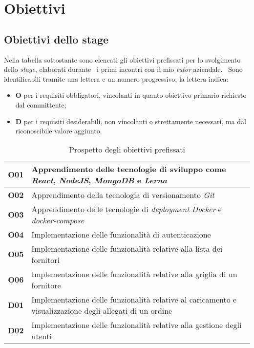 \section{Obiettivi}

\subsection{Obiettivi dello stage}
Nella tabella sottostante sono elencati gli obiettivi prefissati per lo svolgimento dello \emph{stage}, elaborati durante \
i primi incontri con il mio \emph{tutor} aziendale. \
Sono identificabili tramite una lettera e un numero progressivo; la lettera indica:
\begin{itemize}
  \item \textbf{O} per i requisiti obbligatori, vincolanti in quanto obiettivo primario richiesto dal committente;
  \item \textbf{D} per i requisiti desiderabili, non vincolanti o strettamente necessari, ma dal riconoscibile valore aggiunto.
\end{itemize}

\begin{center}
  \begin{table}[h]
    \begin{tabular}{ c | p{\textwidth - 40pt} }
      \textbf{O01} & Apprendimento delle tecnologie di sviluppo come \emph{React}, \emph{NodeJS}, \emph{MongoDB} e \emph{Lerna} \\ \hline
      \textbf{O02} & Apprendimento della tecnologia di versionamento \emph{Git} \\ \hline
      \textbf{O03} & Apprendimento delle tecnologie di \emph{deployment} \emph{Docker} e \emph{docker-compose} \\ \hline
      \textbf{O04} & Implementazione delle funzionalità di autenticazione \\ \hline
      \textbf{O05} & Implementazione delle funzionalità relative alla lista dei fornitori \\ \hline
      \textbf{O06} & Implementazione delle funzionalità relative alla griglia di un fornitore \\ \hline
      \textbf{D01} & Implementazione delle funzionalità relative al caricamento e visualizzazione degli allegati di un ordine \\ \hline
      \textbf{D02} & Implementazione delle funzionalità relative alla gestione degli utenti \\
    \end{tabular}
    \caption{Prospetto degli obiettivi prefissati}
  \end{table}
\end{center}

